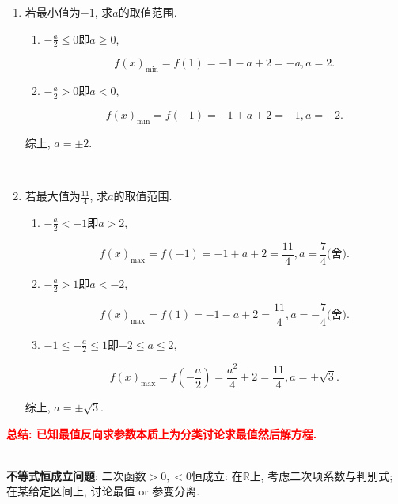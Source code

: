 \documentclass[8pt]{article}
\begin{document}
					\begin{enumerate}[label=(\arabic*)]
						\item 若最小值为$-1$, 求$a$的取值范围.
							~\\

							\begin{enumerate}[label=$\arabic*^{\circ}$]
								\item $-\frac{a}{2}\leq0$即$a\geq0$,

									$$f(x)_{\min}=f(1)=-1-a+2=-a, a=2.$$

								\item $-\frac{a}{2}>0$即$a<0$,

									$$f(x)_{\min}=f(-1)=-1+a+2=-1, a=-2.$$

							\end{enumerate}

							综上, $a=\pm 2.$

						~\\

						\item 若最大值为$\frac{11}{4}$, 求$a$的取值范围.
							~\\

							\begin{enumerate}[label=$\arabic*^{\circ}$]
								\item $-\frac{a}{2}<-1$即$a>2$,

									$$f(x)_{\max}=f(-1)=-1+a+2=\frac{11}{4}, a=\frac{7}{4} \text{(舍)}.$$

								\item $-\frac{a}{2}>1$即$a<-2$,

									$$f(x)_{\max}=f(1)=-1-a+2=\frac{11}{4}, a=-\frac{7}{4} \text{(舍)}.$$

								\item $-1\leq -\frac{a}{2}\leq 1$即$-2\leq a\leq 2$,

									$$f(x)_{\max}=f\left(-\frac{a}{2}\right)=\frac{a^2}{4}+2=\frac{11}{4}, a=\pm \sqrt{3}.$$

							\end{enumerate}

							综上, $a=\pm \sqrt{3}.$

					\end{enumerate}

					\textbf{\textcolor{red}{总结: 已知最值反向求参数本质上为分类讨论求最值然后解方程.}}

				~\\

				\textbf{不等式恒成立问题}: 二次函数$>0, <0$恒成立: 在$\mathbb{R}$上, 考虑二次项系数与判别式; 在某给定区间上, 讨论最值 or 参变分离.
\end{document}

